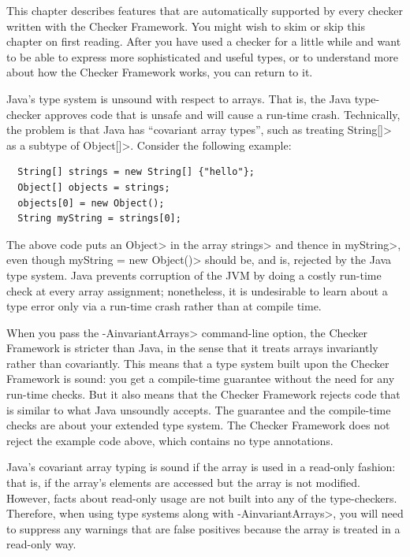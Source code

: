 
This chapter describes features that are automatically supported by every
checker written with the Checker Framework.
You might wish to skim or skip this chapter on first reading.  After you have
used a checker for a little while and want to be able to express more
sophisticated and useful types, or to understand more about how the Checker
Framework works, you can return to it.



Java's type system is unsound with respect to arrays.  That is, the Java
type-checker approves code that is unsafe and will cause a run-time crash.
Technically, the problem is that Java has ``covariant array types'', such
as treating \<String[]> as a subtype of \<Object[]>.  Consider the
following example:

\begin{Verbatim}
  String[] strings = new String[] {"hello"};
  Object[] objects = strings;
  objects[0] = new Object();
  String myString = strings[0];
\end{Verbatim}

\noindent
The above code puts an \<Object> in the array \<strings> and thence in
\<myString>, even though \<myString = new Object()> should be, and is,
rejected by the Java type system.  Java prevents corruption of the JVM by
doing a costly run-time check at every array assignment; nonetheless, it is
undesirable to learn about a type error only via a run-time crash rather
than at compile time.

When you pass the \<-AinvariantArrays> command-line option,
the Checker Framework is stricter than Java, in the sense that it treats
arrays invariantly rather than covariantly.  This means that a type system
built upon the Checker Framework is sound:  you get a compile-time
guarantee without the need for any run-time checks.  But it also means that
the Checker Framework rejects code that is similar to what Java unsoundly
accepts.  The guarantee and the compile-time checks are about your
extended type system.  The Checker Framework does not reject the example
code above, which contains no type annotations.

Java's covariant array typing is sound if the array is used in a read-only
fashion:  that is, if the array's elements are accessed but the array is
not modified.  However, facts about read-only usage are not built into any of
the type-checkers.  Therefore, when using type systems
along with \<-AinvariantArrays>, you will need to suppress any warnings that
are false positives because the array is treated in a read-only way.



